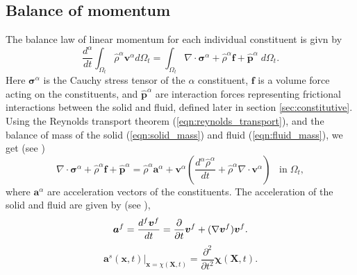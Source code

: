 \subsection{Balance of momentum}
The balance law of linear momentum for each individual constituent is givn by
\begin{equation}
\frac{d^{\alpha}}{dt} \int_{\Omega_{t}} \hat\rho^{\alpha}\boldsymbol{v}^{\alpha} d\Omega_{t} =\int_{\Omega_{t}} \nabla \cdot \boldsymbol\sigma^{\alpha} + \hat\rho^{\alpha} {\boldsymbol{f}} + \hat{\boldsymbol{p}}^{\alpha}  \; d\Omega_{t}.
\label{eqn:momentum_alpha_axium}
\end{equation}
Here $\boldsymbol\sigma^{\alpha}$ is the Cauchy stress tensor of the $\alpha$ constituent, $\boldsymbol{f}$ is a volume force acting on the constituents, and $\hat{\boldsymbol{p}}^{\alpha}$ are interaction forces representing frictional interactions between the solid and fluid, defined later in section \ref{sec:constitutive}. Using the Reynolds transport theorem (\ref{eqn:reynolds_transport}), and the balance of mass of the solid (\ref{eqn:solid_mass}) and fluid (\ref{eqn:fluid_mass}), we get (see \citet[eqn. (4.15)]{boer2005trends})
\begin{equation}
\nabla \cdot \boldsymbol\sigma^{\alpha} + \hat\rho^{\alpha}\boldsymbol{f} + \hat{\boldsymbol{p}}^{\alpha}=\hat\rho^{\alpha}\boldsymbol{a}^{\alpha} +  \boldsymbol{v}^{\alpha}\left(  \frac{d^{\alpha}\hat{\rho}^{\alpha}  }{dt}  + \hat{\rho}^{\alpha}  \nabla \cdot \boldsymbol{v}^{\alpha} \right)\;\;\;\mbox{in}\;\Omega_{t},
\label{eqn:momentum_alpha}
\end{equation}
where $\boldsymbol{a}^{\alpha}$ are acceleration vectors of the constituents. The acceleration of the solid and fluid are given by (see \citet[eqn. (3.7,3.9)]{boer2005trends}), 
\begin{equation}
\boldsymbol{a}^{f} = \frac{d^{f} \boldsymbol{v}^{f}}{d t} = \frac{\partial }{\partial t}\boldsymbol{v}^{f} + (\nabla \boldsymbol{v}^{f})\boldsymbol{v}^{f}.
 \label{eqn:fluid_acceleration}
\end{equation}
\begin{equation}
 \boldsymbol{a}^{s}(\boldsymbol{x},t)|_{\boldsymbol{x}={\chi}(\boldsymbol{X},t)}=   \frac{\partial^{2}}{\partial t^{2}}\boldsymbol\chi(\boldsymbol{X},t) . 
 \label{eqn:spatial_solid_acceleration}
\end{equation}
